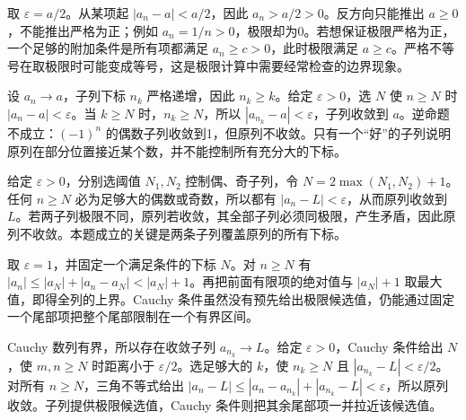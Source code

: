 \documentclass[UTF8,12pt,a4paper,fontset=fandol]{ctexart}
\begin{document}
\begin{solve}\label{ans:c2q6}
取 $\varepsilon=a/2$。从某项起 $|a_n-a|<a/2$，因此 $a_n>a/2>0$。反方向只能推出 $a\ge0$，不能推出严格为正；例如 $a_n=1/n>0$，极限却为0。若想保证极限严格为正，一个足够的附加条件是所有项都满足 $a_n\ge c>0$，此时极限满足 $a\ge c$。严格不等号在取极限时可能变成等号，这是极限计算中需要经常检查的边界现象。
\end{solve}

\begin{solve}\label{ans:c2q7}
设 $a_n\to a$，子列下标 $n_k$ 严格递增，因此 $n_k\ge k$。给定 $\varepsilon>0$，选 $N$ 使 $n\ge N$ 时 $|a_n-a|<\varepsilon$。当 $k\ge N$ 时，$n_k\ge N$，所以 $|a_{n_k}-a|<\varepsilon$，子列收敛到 $a$。逆命题不成立：$(-1)^n$ 的偶数子列收敛到1，但原列不收敛。只有一个“好”的子列说明原列在部分位置接近某个数，并不能控制所有充分大的下标。
\end{solve}

\begin{solve}\label{ans:c2q8}
给定 $\varepsilon>0$，分别选阈值 $N_1,N_2$ 控制偶、奇子列，令 $N=2\max(N_1,N_2)+1$。任何 $n\ge N$ 必为足够大的偶数或奇数，所以都有 $|a_n-L|<\varepsilon$，从而原列收敛到 $L$。若两子列极限不同，原列若收敛，其全部子列必须同极限，产生矛盾，因此原列不收敛。本题成立的关键是两条子列覆盖原列的所有下标。
\end{solve}

\begin{solve}\label{ans:c2q9}
取 $\varepsilon=1$，并固定一个满足条件的下标 $N$。对 $n\ge N$ 有 $|a_n|\le|a_N|+|a_n-a_N|<|a_N|+1$。再把前面有限项的绝对值与 $|a_N|+1$ 取最大值，即得全列的上界。Cauchy 条件虽然没有预先给出极限候选值，仍能通过固定一个尾部项把整个尾部限制在一个有界区间。
\end{solve}

\begin{solve}\label{ans:c2q10}
Cauchy 数列有界，所以存在收敛子列 $a_{n_k}\to L$。给定 $\varepsilon>0$，Cauchy 条件给出 $N$，使 $m,n\ge N$ 时距离小于 $\varepsilon/2$。选足够大的 $k$，使 $n_k\ge N$ 且 $|a_{n_k}-L|<\varepsilon/2$。对所有 $n\ge N$，三角不等式给出 $|a_n-L|\le|a_n-a_{n_k}|+|a_{n_k}-L|<\varepsilon$，所以原列收敛。子列提供极限候选值，Cauchy 条件则把其余尾部项一并拉近该候选值。
\end{solve}
\end{document}
